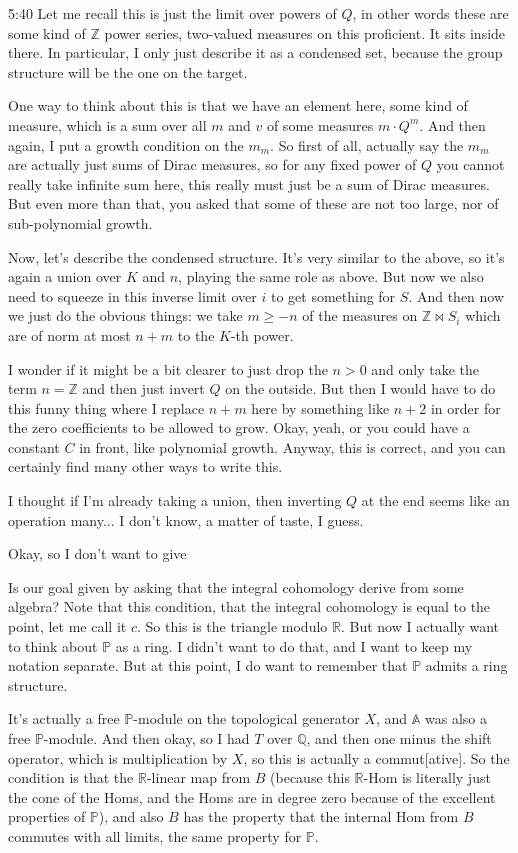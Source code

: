 \begin{unfinished}{5:40}
Let me recall this is just the limit over powers of $Q$, in other words these are some kind of $\mathbb{Z}$ power series, two-valued measures on this proficient. It sits inside there. In particular, I only just describe it as a condensed set, because the group structure will be the one on the target.

One way to think about this is that we have an element here, some kind of measure, which is a sum over all $m$ and $v$ of some measures $m \cdot Q^m$. And then again, I put a growth condition on the $m_m$. So first of all, actually say the $m_m$ are actually just sums of Dirac measures, so for any fixed power of $Q$ you cannot really take infinite sum here, this really must just be a sum of Dirac measures. But even more than that, you asked that some of these are not too large, nor of sub-polynomial growth.

Now, let's describe the condensed structure. It's very similar to the above, so it's again a union over $K$ and $n$, playing the same role as above. But now we also need to squeeze in this inverse limit over $i$ to get something for $S$. And then now we just do the obvious things: we take $m \geq -n$ of the measures on $\mathbb{Z} \Join S_i$ which are of norm at most $n + m$ to the $K$-th power.

I wonder if it might be a bit clearer to just drop the $n > 0$ and only take the term $n = \mathbb{Z}$ and then just invert $Q$ on the outside. But then I would have to do this funny thing where I replace $n + m$ here by something like $n + 2$ in order for the zero coefficients to be allowed to grow. Okay, yeah, or you could have a constant $C$ in front, like polynomial growth. Anyway, this is correct, and you can certainly find many other ways to write this.

I thought if I'm already taking a union, then inverting $Q$ at the end seems like an operation many... I don't know, a matter of taste, I guess.

Okay, so I don't want to give

Is our goal given by asking that the integral cohomology derive from some algebra? Note that this condition, that the integral cohomology is equal to the point, let me call it $c$. So this is the triangle modulo $\mathbb{R}$. But now I actually want to think about $\mathbb{P}$ as a ring. I didn't want to do that, and I want to keep my notation separate. But at this point, I do want to remember that $\mathbb{P}$ admits a ring structure.

It's actually a free $\mathbb{P}$-module on the topological generator $X$, and $\mathbb{A}$ was also a free $\mathbb{P}$-module. And then okay, so I had $T$ over $\mathbb{Q}$, and then one minus the shift operator, which is multiplication by $X$, so this is actually a commut[ative]. So the condition is that the $\mathbb{R}$-linear map from $B$ (because this $\mathbb{R}$-Hom is literally just the cone of the Homs, and the Homs are in degree zero because of the excellent properties of $\mathbb{P}$), and also $B$ has the property that the internal Hom from $B$ commutes with all limits, the same property for $\mathbb{P}$.


\end{unfinished}
